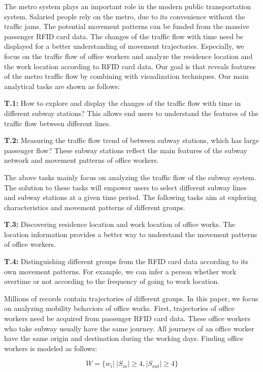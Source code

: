 \documentclass[journal]{IEEEtran}
\begin{document}
The metro system plays an important role in the modern public transportation system. Salaried people rely on the metro, due to its convenience without the traffic jams. The potential movement patterns can be funded from the massive passenger RFID card data. The changes of the traffic flow with time need be displayed for a better understanding of movement trajectories. Especially, we focus on the traffic flow of office workers and analyze the residence location and the work location according to RFID card data. Our goal is that reveals features of the metro traffic flow by combining with visualization techniques. Our main analytical tasks are shown as follows: 

\textbf{T.1:} How to explore and display the changes of the traffic flow with time in different subway stations? This allows end users to understand the features of the traffic flow between different lines.

\textbf{T.2:} Measuring the traffic flow trend of between subway stations, which has large passenger flow? These subway stations reflect the main features of the subway network and movement patterns of office workers. 

The above tasks mainly focus on analyzing the traffic flow of the subway system. The solution to these tasks will empower users to select different subway lines and subway stations at a given time period. The following tasks aim at exploring characteristics and movement patterns of different groups.

\textbf{T.3:} Discovering residence location and work location of office works. The location information provides a better way to understand the movement patterns of office workers. 

\textbf{T.4:} Distinguishing different groups from the RFID card data according to its own movement patterns. For example, we can infer a person whether work overtime or not according to the frequency of going to work location.


Millions of records contain trajectories of different groups. In this paper, we focus on analyzing mobility behaviors of office works. First, trajectories of office workers need be acquired from passenger RFID card data. These office workers who take subway usually have the same journey. All journeys of an office worker have the same origin and destination during the working days. Finding office workers is modeled as follows:

\begin{equation}
W=\{w_{i}|\ { }|S_{in}|\ge4,|S_{out}|\ge4\}
\end{equation}
\end{document}
